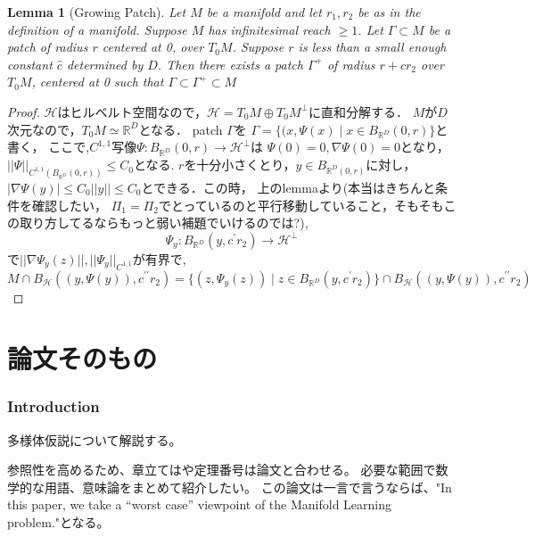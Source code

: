 \documentclass{ujarticle}
\newtheorem{lem}[thm]{Lemma}
\begin{document}
\begin{lem}[Growing Patch]
  Let $M$ be a manifold and let $r_1,r_2$ be as in the definition of a manifold.
Suppose $M$ has infinitesimal reach $ \ge 1$. Let $\Gamma \subset M$ be a patch of radius $r$ centered at 0, over $T_0M$. Suppose
$r$ is less than a small enough constant $\hat{c}$ determined by $D$. Then there exists a patch $\Gamma^{+}$ of radius $r + cr_2$
over $T_0M$, centered at 0 such that $\Gamma \subset \Gamma^{+} \subset M$
\end{lem}
\begin{proof}
 $\mathcal{H}$はヒルベルト空間なので，$\mathcal{H}=T_0M \oplus T_0M^{\perp}$に直和分解する．
 $M$が$D$次元なので，$T_0M \simeq \mathbb{R}^D$となる．
 patch $\Gamma$を
 $\Gamma =\{(x,\Psi(x) \mid x \in B_{\mathbb{R}^D}(0,r) \}$と書く，
ここで,$C^{1,1}$写像$\Psi: B_{\mathbb{R}^D}(0,r) \to \mathcal{H}^{\perp}$は
$\Psi(0)=0,\nabla\Psi(0)=0$となり，$||\Psi||_{C^{1,1}(B_{\mathbb{R}^D}(0,r))} \le C_0$となる.
$r$を十分小さくとり，$y \in B_{\mathbb{R}^D(0,r)}$に対し，
$|\nabla \Psi(y)| \le C_0||y|| \le C_0$とできる．この時，
上のlemmaより(本当はきちんと条件を確認したい，
$\Pi_1=\Pi_2$でとっているのと平行移動していること，そもそもこの取り方してるならもっと弱い補題でいけるのでは?),
\begin{equation*}
 \Psi_y:B_{\mathbb{R}^D}(y,c^{\prime} r_2) \to \mathcal{H}^{\perp}
\end{equation*}
で$||\nabla\Psi_y(z)||,||\Psi_y||_{C^{1,1}}$が有界で,
\begin{equation*}
 M \cap B_{\mathcal{H}}((y,\Psi(y)),c^{\prime\prime} r_2) =
 \{ (z,\Psi_y(z)) \mid z \in B_{\mathbb{R}^D}(y,c^{\prime} r_2)\}
 \cap B_{\mathcal{H}}((y,\Psi(y)),c^{\prime\prime} r_2)
\end{equation*}
\end{proof}


\part{論文そのもの}




\setcounter{section}{0}
\section{Introduction}
\label{sec:Introduction}
多様体仮説について解説する。

参照性を高めるため、章立てはや定理番号は論文と合わせる。
必要な範囲で数学的な用語、意味論をまとめて紹介したい。
この論文は一言で言うならば、"In this paper, we take a “worst case” viewpoint of the Manifold Learning problem."となる。
\end{document}
